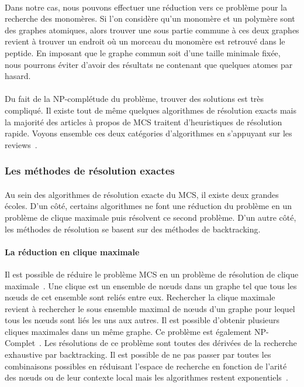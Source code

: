 \documentclass[12pt,french,twoside]{report}
\begin{document}
\paragraph{}Dans notre cas, nous pouvons effectuer une réduction vers ce problème pour la recherche des monomères.
Si l'on considère qu'un monomère et un polymère sont des graphes atomiques, alors trouver une sous partie commune à ces deux graphes revient à trouver un endroit où un morceau du monomère est retrouvé dans le peptide.
En imposant que le graphe commun soit d'une taille minimale fixée, nous pourrons éviter d'avoir des résultats ne contenant que quelques atomes par hasard.

\paragraph{}Du fait de la NP-complétude du problème, trouver des solutions est très compliqué.
Il existe tout de même quelques algorithmes de résolution exacts mais la majorité des articles à propos de MCS traitent d'heuristiques de résolution rapide.
Voyons ensemble ces deux catégories d'algorithmes en s'appuyant sur les reviews~\cite{raymond_maximum_2002, ehrlich_maximum_2011}.


\subsubsection{Les méthodes de résolution exactes}

\paragraph{}Au sein des algorithmes de résolution exacte du MCS, il existe deux grandes écoles.
D'un côté, certains algorithmes ne font une réduction du problème en un problème de clique maximale puis résolvent ce second problème.
D'un autre côté, les méthodes de résolution se basent sur des méthodes de backtracking.



\paragraph{La réduction en clique maximale}
Il est possible de réduire le problème MCS en un problème de résolution de clique maximale~\cite{pelillo_matching_1999,grosso_simple_2008,rahman_small_2009}.
Une clique est un ensemble de n\oe{}uds dans un graphe tel que tous les n\oe{}uds de cet ensemble sont reliés entre eux.
Rechercher la clique maximale revient à rechercher le sous ensemble maximal de n\oe{}uds d'un graphe pour lequel tous les n\oe{}uds sont liés les uns aux autres.
Il est possible d'obtenir plusieurs cliques maximales dans un même graphe.
Ce problème est également NP-Complet~\cite{akkoyunlu_enumeration_1973}.
Les résolutions de ce problème sont toutes des dérivées de la recherche exhaustive par backtracking.
Il est possible de ne pas passer par toutes les combinaisons possibles en réduisant l'espace de recherche en fonction de l'arité des n\oe{}uds ou de leur contexte local mais les algorithmes restent exponentiels~\cite{tomita_worst-case_2004}.
\end{document}
